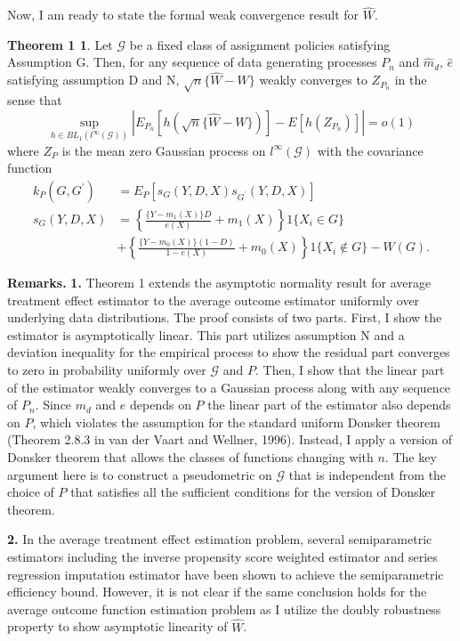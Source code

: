 \documentclass[12pt,oneside,reqno,english]{amsart}
\theoremstyle{definition}
\newtheorem*{thm1}{Theorem 1}
\begin{document}
Now, I am ready to state the formal weak convergence result for $\hat{W}$.
\begin{thm1}
Let $\mathcal{G}$ be a fixed class of assignment policies satisfying Assumption G.  
Then, for any sequence of data generating processes $P_{n}$ and $\hat{m}_{d}$, $\hat{e}$ satisfying assumption D and N, 
$\sqrt{n}\{\hat{W}-W\}$ weakly converges to $Z_{P_{n}}$ in the sense that
\[\sup_{h\in BL_{1}(l^{\infty}(\mathcal{G}))}|E_{P_{n}}[h(\sqrt{n}\{\hat{W}-W\})]-E[h(Z_{P_{n}})]|=o(1)\]
where $Z_{P}$ is the mean zero Gaussian process on $l^{\infty}(\mathcal{G})$ with the covariance function
\begin{align*}
k_{P}(G,G^{\prime})&=E_{P}[s_{G}(Y,D,X)s_{G^{\prime}}(Y,D,X)]\\
s_{G}(Y,D,X)&=\left\{\frac{\{Y-m_{1}(X)\}D}{e(X)}+m_{1}(X)\right\}1\{X_{i}\in G\}\\
&+\left\{\frac{\{Y-m_{0}(X)\}(1-D)}{1-e(X)}+m_{0}(X)\right\}1\{X_{i}\not\in G\}-W(G).
\end{align*}
\end{thm1}
\textbf{Remarks.} 
\textbf{1.} Theorem 1 extends the asymptotic normality result for average treatment effect estimator to the average outcome estimator uniformly over underlying data distributions. The proof consists of two parts. 
First, I show the estimator is asymptotically linear. This part utilizes assumption N and a deviation inequality for the empirical process 
to show the residual part converges to zero in probability uniformly over $\mathcal{G}$ and $P$. 
Then, I show that the linear part of the estimator weakly converges to a Gaussian process along with any sequence of $P_{n}$. 
Since $m_{d}$ and $e$ depends on $P$ the linear part of the estimator also depends on $P$, which violates the assumption for the standard uniform Donsker theorem (Theorem 2.8.3 in van der Vaart and Wellner, 1996). Instead, I apply a version of Donsker theorem that allows the classes of functions changing with $n$. The key argument here is to construct a pseudometric on $\mathcal{G}$ that is independent from the choice of $P$ that satisfies all the sufficient conditions for 
the version of Donsker theorem.  

\textbf{2.} In the average treatment effect estimation problem, several semiparametric estimators  
including the inverse propensity score weighted estimator \citep{HIR:03} and series regression imputation estimator \citep{Hahn:98} 
have been shown to achieve the semiparametric efficiency bound. However, it is not clear if the same conclusion holds for the average outcome function estimation problem
as I utilize the doubly robustness property to show asymptotic linearity of $\hat{W}$. 
\end{document}
